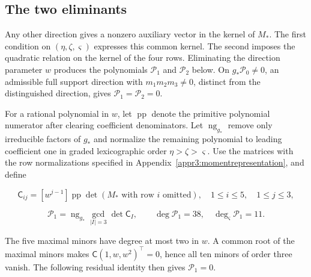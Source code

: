 \documentclass[11pt,a4paper]{article}
\numberwithin{equation}{section}
\theoremstyle{plain}
\theoremstyle{definition}
\theoremstyle{remark}
\begin{document}
\subsection{The two eliminants}\label{appr3:eliminants}\label{r3:determinants}

Any other direction gives a nonzero auxiliary vector in the kernel of
$M_*$. The first condition on $(\eta ,\zeta ,\varsigma )$ expresses this common kernel.
The second imposes the quadratic relation on the kernel of the
four rows. Eliminating the direction parameter $w$ produces
the polynomials $\mathcal P_1$ and $\mathcal P_2$ below. On
$g_*\mathcal P_0\ne0$, an admissible full support direction with
$m_1m_2m_3\ne0$, distinct from the distinguished direction, gives
$\mathcal P_1=\mathcal P_2=0$.

For a rational polynomial in $w$, let $\operatorname{pp}$ denote the
primitive polynomial numerator after clearing coefficient denominators.
Let $\operatorname{ng}_{g_*}$ remove only irreducible factors of $g_*$ and
normalize the remaining polynomial to leading coefficient one in
graded lexicographic order $\eta >\zeta >\varsigma $. Use the matrices with the row normalizations specified in
Appendix~\ref{appr3:momentrepresentation}, and define

\begin{equation}\mathsf C_{ij}=[w^{j-1}]\operatorname{pp}\det(M_*\text{ with row }i\text{ omitted}),\quad 1\le i\le5,\quad1\le j\le3,\end{equation}

\begin{equation}\mathcal P_1=\operatorname{ng}_{g_*}\gcd_{|I|=3}\det \mathsf C_I,\qquad \deg \mathcal P_1=38,\quad\deg_\varsigma \mathcal P_1=11.\end{equation}

The five maximal minors have degree at most two in $w$.
A common root of the maximal minors makes $\mathsf C(1,w,w^2)^{\top}=0$, hence all ten
minors of order three vanish. The following residual identity then gives
$\mathcal P_1=0$.
\end{document}
